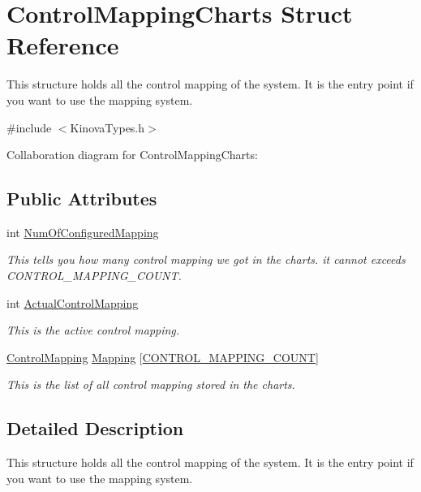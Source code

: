 \hypertarget{struct_control_mapping_charts}{}\section{Control\+Mapping\+Charts Struct Reference}
\label{struct_control_mapping_charts}


This structure holds all the control mapping of the system. It is the entry point if you want to use the mapping system.  




{\ttfamily \#include $<$Kinova\+Types.\+h$>$}



Collaboration diagram for Control\+Mapping\+Charts\+:
\subsection*{Public Attributes}
\begin{DoxyCompactItemize}
\item 
int \hyperlink{struct_control_mapping_charts_a302a3bc9e63b9e737ca9c99bb251e4d7}{Num\+Of\+Configured\+Mapping}
\begin{DoxyCompactList}\small\item\em This tells you how many control mapping we got in the charts. it cannot exceeds C\+O\+N\+T\+R\+O\+L\+\_\+\+M\+A\+P\+P\+I\+N\+G\+\_\+\+C\+O\+U\+NT. \end{DoxyCompactList}\item 
int \hyperlink{struct_control_mapping_charts_a72cbb9155615519fd17ea5228fd19f8f}{Actual\+Control\+Mapping}
\begin{DoxyCompactList}\small\item\em This is the active control mapping. \end{DoxyCompactList}\item 
\hyperlink{struct_control_mapping}{Control\+Mapping} \hyperlink{struct_control_mapping_charts_a1b72a247e0b46f49b30221f2b4f7497e}{Mapping} \mbox{[}\hyperlink{_kinova_types_8h_a51a2dde57dc5de96d6c31a742780c8b3}{C\+O\+N\+T\+R\+O\+L\+\_\+\+M\+A\+P\+P\+I\+N\+G\+\_\+\+C\+O\+U\+NT}\mbox{]}
\begin{DoxyCompactList}\small\item\em This is the list of all control mapping stored in the charts. \end{DoxyCompactList}\end{DoxyCompactItemize}


\subsection{Detailed Description}
This structure holds all the control mapping of the system. It is the entry point if you want to use the mapping system. 

